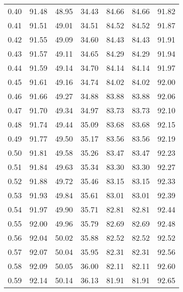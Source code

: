 \begin{tabular}{|c|c|c|c|c|c|c|}
      0.40 &     91.48 &     48.95 &      34.43 &   84.66 &      84.66 &         91.82 \\
      0.41 &     91.51 &     49.01 &      34.51 &   84.52 &      84.52 &         91.87 \\
      0.42 &     91.55 &     49.09 &      34.60 &   84.43 &      84.43 &         91.91 \\
      0.43 &     91.57 &     49.11 &      34.65 &   84.29 &      84.29 &         91.94 \\
      0.44 &     91.59 &     49.14 &      34.70 &   84.14 &      84.14 &         91.97 \\
      0.45 &     91.61 &     49.16 &      34.74 &   84.02 &      84.02 &         92.00 \\
      0.46 &     91.66 &     49.27 &      34.88 &   83.88 &      83.88 &         92.06 \\
      0.47 &     91.70 &     49.34 &      34.97 &   83.73 &      83.73 &         92.10 \\
      0.48 &     91.74 &     49.44 &      35.09 &   83.68 &      83.68 &         92.15 \\
      0.49 &     91.77 &     49.50 &      35.17 &   83.56 &      83.56 &         92.19 \\
      0.50 &     91.81 &     49.58 &      35.26 &   83.47 &      83.47 &         92.23 \\
      0.51 &     91.84 &     49.63 &      35.34 &   83.30 &      83.30 &         92.27 \\
      0.52 &     91.88 &     49.72 &      35.46 &   83.15 &      83.15 &         92.33 \\
      0.53 &     91.93 &     49.84 &      35.61 &   83.01 &      83.01 &         92.39 \\
      0.54 &     91.97 &     49.90 &      35.71 &   82.81 &      82.81 &         92.44 \\
      0.55 &     92.00 &     49.96 &      35.79 &   82.69 &      82.69 &         92.48 \\
      0.56 &     92.04 &     50.02 &      35.88 &   82.52 &      82.52 &         92.52 \\
      0.57 &     92.07 &     50.04 &      35.95 &   82.31 &      82.31 &         92.56 \\
      0.58 &     92.09 &     50.05 &      36.00 &   82.11 &      82.11 &         92.60 \\
      0.59 &     92.14 &     50.14 &      36.13 &   81.91 &      81.91 &         92.65 \\

\end{tabular}

